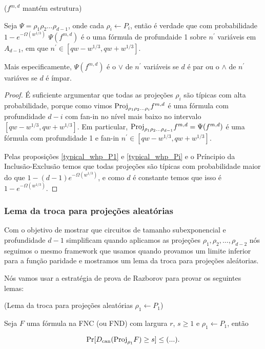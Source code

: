 \begin{prop} ($f^{m, d}$ mantém estrutura) \label{struct_preserve}

Seja $\Psi = \rho_{1}\rho_{2}\dots\rho_{d - 1}$, onde cada $\rho_{i} \leftarrow P_{i}$, então é verdade que com probabilidade $1 - e^{-\Omega(w^{1/3})}$ $\Psi(f^{m, d})$ é o uma fórmula de profundaide 1 sobre $n^{\prime}$ variáveis em $A_{d - 1}$, em que $n^{\prime} \in [qw - w^{1/3}, qw + w^{1/3}]$.

Mais especificamente, $\Psi(f^{m, d})$ é o $\lor$ de $n^{\prime}$ variáveis se $d$ é par ou o $\land$ de $n^{\prime}$ variáves se $d$ é ímpar.

\end{prop}

\begin{proof}

É suficiente argumentar que todas as projeções $\rho_{i}$ são típicas com alta probabilidade, porque como vimos $\text{Proj}_{\rho_{1}\rho_{2}\dots\rho_{i}}f^{m, d}$ é uma fórmula com profundidade $d - i$ com fan-in no nível mais baixo no intervalo $[qw - w^{1/3}, qw + w^{1/3}]$. Em particular, $\text{Proj}_{\rho_{1}\rho_{2}\dots\rho_{d - 1}}f^{m, d} = \Psi(f^{m, d})$ é uma fórmula com profundidade 1 e fan-in $n^{\prime} \in [qw - w^{1/3}, qw + w^{1/3}]$.

Pelas proposições \ref{typical_whp_P1} e \ref{typical_whp_Pi} e o Príncipio da Inclusão-Exclusão temos que todas projeções são típicas com probabilidade maior do que $1 - (d - 1)e^{-\Omega(w^{1/3})}$, e como $d$ é constante temos que isso é $1 - e^{-\Omega(w^{1/3})}$. 

\end{proof}

\subsubsection{Lema da troca para projeções aleatórias}

Com o objetivo de mostrar que circuitos de tamanho subexponencial e profundidade $d - 1$ simplificam quando aplicamos as projeções $\rho_{1}, \rho_{2}, \dots, \rho_{d - 2}$ nós seguimos o mesmo framework que usamos quando provamos um limite inferior para a função paridade e mostramos um lema da troca para projeções aleátorias.

Nós vamos usar a estratégia de prova de Razborov para provar os seguintes lemas:

\begin{lema} (Lema da troca para projeções aleatórias $\rho_{1} \leftarrow P_{1}$) \label{projection_switching_lemma_P1}

Seja $F$ uma fórmula na FNC (ou FND) com largura $r$, $s \geq 1$ e $\rho_{1} \leftarrow P_{1}$, então

\begin{equation*}
	\Pr[D_{\text{can}}(\text{Proj}_{\rho_{1}}F) \geq s] \leq (...).
\end{equation*} 

\end{lema}

